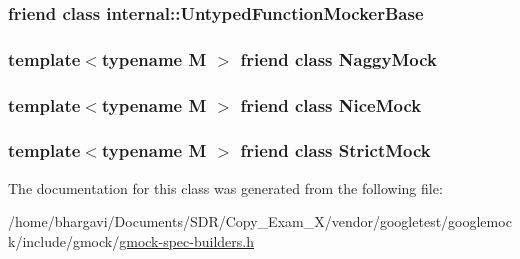\subsubsection[{\texorpdfstring{internal\+::\+Untyped\+Function\+Mocker\+Base}{internal::UntypedFunctionMockerBase}}]{\setlength{\rightskip}{0pt plus 5cm}friend class {\bf internal\+::\+Untyped\+Function\+Mocker\+Base}\hspace{0.3cm}{\ttfamily [friend]}}\hypertarget{classtesting_1_1_mock_aa199ba5b2fe114afc42c43912a582feb}{}\label{classtesting_1_1_mock_aa199ba5b2fe114afc42c43912a582feb}
\subsubsection[{\texorpdfstring{Naggy\+Mock}{NaggyMock}}]{\setlength{\rightskip}{0pt plus 5cm}template$<$typename M $>$ friend class {\bf Naggy\+Mock}\hspace{0.3cm}{\ttfamily [friend]}}\hypertarget{classtesting_1_1_mock_aee2e427ecb34e6662477add3bb5f8819}{}\label{classtesting_1_1_mock_aee2e427ecb34e6662477add3bb5f8819}
\subsubsection[{\texorpdfstring{Nice\+Mock}{NiceMock}}]{\setlength{\rightskip}{0pt plus 5cm}template$<$typename M $>$ friend class {\bf Nice\+Mock}\hspace{0.3cm}{\ttfamily [friend]}}\hypertarget{classtesting_1_1_mock_a9e796f79d4c876398f83aa7678dddc46}{}\label{classtesting_1_1_mock_a9e796f79d4c876398f83aa7678dddc46}
\subsubsection[{\texorpdfstring{Strict\+Mock}{StrictMock}}]{\setlength{\rightskip}{0pt plus 5cm}template$<$typename M $>$ friend class {\bf Strict\+Mock}\hspace{0.3cm}{\ttfamily [friend]}}\hypertarget{classtesting_1_1_mock_a88b3d71476c27b82c88bd49e8297e20e}{}\label{classtesting_1_1_mock_a88b3d71476c27b82c88bd49e8297e20e}


The documentation for this class was generated from the following file\+:\begin{DoxyCompactItemize}
\item 
/home/bhargavi/\+Documents/\+S\+D\+R/\+Copy\+\_\+\+Exam\+\_\+X/vendor/googletest/googlemock/include/gmock/\hyperlink{gmock-spec-builders_8h}{gmock-\/spec-\/builders.\+h}\end{DoxyCompactItemize}
